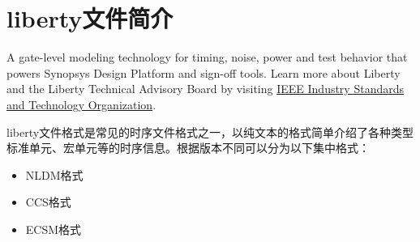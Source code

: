 \section{liberty文件简介}
A gate-level modeling technology for timing, noise, power and test behavior that powers Synopsys Design Platform and sign-off tools. Learn more about Liberty and the Liberty Technical Advisory Board by visiting \href{http://ieee-isto.org/member_programs/liberty-technical-advisory-board/}{IEEE Industry Standards and Technology Organization}.

liberty文件格式是常见的时序文件格式之一，以纯文本的格式简单介绍了各种类型标准单元、宏单元等的时序信息。根据版本不同可以分为以下集中格式：
\begin{itemize}
\item NLDM格式
\item CCS格式
\item ECSM格式
\end{itemize}

